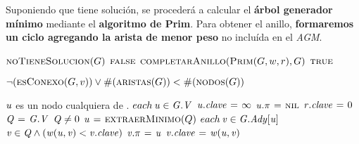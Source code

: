 Suponiendo que tiene solución, se procederá a calcular el \textbf{árbol
generador mínimo} mediante el \textbf{algoritmo de Prim}. Para obtener el
anillo, \textbf{formaremos un ciclo agregando la arista de menor peso} no
incluída en el \textit{AGM}.


\begin{codebox}
\li \If $\textnormal{\scshape noTieneSolucion}(G)$
\li     \Then
            \Return $\textnormal{\scshape false}$
        \End
\li $\textnormal{\scshape completarAnillo}(\textnormal{\scshape Prim}(G,w,r),G)$
\li \Return $\textnormal{\scshape true}$
\end{codebox}


\vspace*{0.3cm}


\begin{codebox}
\li \Return $\neg (\textnormal{\scshape esConexo}(G,v)) \lor
    \textnormal{\scshape\#}(\textnormal{\scshape aristas}(G)) <
    \textnormal{\scshape\#}(\textnormal{\scshape nodos}(G))$
\end{codebox}


\vspace*{0.3cm}


\begin{codebox}
\li \Comment $\id{u}$ es un nodo cualquiera de .
\li \For $each \hspace{0.07cm} \id{u} \in \id{G.V}$
\li     \Do
            $\id{u.clave} \gets \infty$
\li         $\id{u.\pi} \gets \const{nil}$
        \End
\li $\id{r.clave} \gets 0$
\li $\id{Q} \gets \id{G.V}$
\li \While $\id{Q} \neq 0$
\li     \Do
            $\id{u} \gets \proc{extraerMinimo}(Q)$
\li         \For $each \hspace{0.07cm} \id{v} \in \id{G.Ady[u]}$
                \Do
\li                 \If $\id{v} \in \id{Q} \land (\id{w(u,v)} < \id{v.clave})$
\li                     \Then
                            $\id{v.\pi} \gets \id{u}$
\li                         $\id{v.clave} \gets \id{w(u,v)}$
                        \End
                \End
        \End
\end{codebox}


\vspace*{0.3cm}


